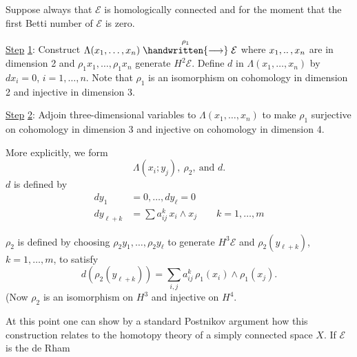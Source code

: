 Suppose always that $\mathcal{E}$ is homologically connected and for the moment that the first Betti number of $\mathcal{E}$ is zero.

\uline{Step} \uline{1}: Construct $\Lambda(x_1,\ldots,x_n)\mathrel{\overset{\rho_1}{\handwritten{\longrightarrow}}}\mathcal{E}$ where $x_1,\mathinner{..},x_n$ are in dimension 2 and $\rho_1x_1,\ldots,\rho_1x_n$ generate $H^2\mathcal{E}$. Define $d$ in $\Lambda(x_1,\ldots,x_n)$ by $dx_i=0$, $i=1,\ldots,n$. Note that $\rho_1$ is an isomorphism on cohomology in dimension 2 and injective in dimension 3.

\uline{Step} \uline{2}: Adjoin three-dimensional variables to $\Lambda(x_1,\ldots,x_n)$ to make $\rho_1$ surjective on cohomology in dimension 3 and injective on cohomology in dimension 4.

More explicitly, we form
\[
 \Lambda(x_i;y_j),\ \rho_2,\ \text{and }d.
\]
$d$ is defined by
\[
\begin{aligned}
 dy_1&=0,\ldots,dy_\ell=0\\
 dy_{\ell+k}&=\sum a_{ij}^k\,x_i\wedge x_j\qquad k=1,\ldots,m
\end{aligned}
\]

$\rho_2$ is defined by choosing $\rho_2y_1,\ldots,\rho_2y_\ell$ to generate $H^3\mathcal{E}$ and $\rho_2(y_{\ell+k})$, $k=1,\ldots,m$, to satisfy
\[
 d(\rho_2(y_{\ell+k}))=\sum_{i,j}a_{ij}^k\,\rho_1(x_i)\wedge\rho_1(x_j).
\]
(Now $\rho_2$ is an isomorphism on $H^3$ and injective on $H^4$.

At this point one can show by a standard Postnikov argument how this construction relates to the homotopy theory of a simply connected space $X$. If $\mathcal{E}$ is the de Rham

